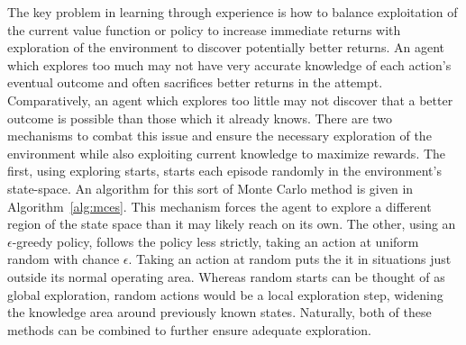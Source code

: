 The key problem in learning through experience is how to balance
exploitation of the current value function or policy
to increase immediate returns
with exploration of the environment to discover potentially better returns.
%
An agent which explores too much
may not have very accurate knowledge of each action's eventual outcome
and often sacrifices better returns in the attempt.
%
Comparatively,
an agent which explores too little
may not discover that a better outcome is possible
than those which it already knows.
%
There are two mechanisms to combat this issue
and ensure the necessary exploration of the environment
while also exploiting current knowledge to maximize rewards.
%
The first,
using exploring starts,
starts each episode randomly in the environment's state-space.
%
An algorithm for this sort of Monte Carlo method is given in
Algorithm~\ref{alg:mces}.
%
This mechanism forces the agent to explore a different region
of the state space than it may likely reach on its own.
%
The other,
using an $\epsilon$-greedy policy,
follows the policy less strictly,
taking an action at uniform random with chance $\epsilon$.
%
Taking an action at random puts the it in situations
just outside its normal operating area.
%
Whereas random starts can be thought of as global exploration,
random actions would be a local exploration step,
widening the knowledge area around previously known states.
%
Naturally,
both of these methods can be combined to further ensure adequate exploration.


